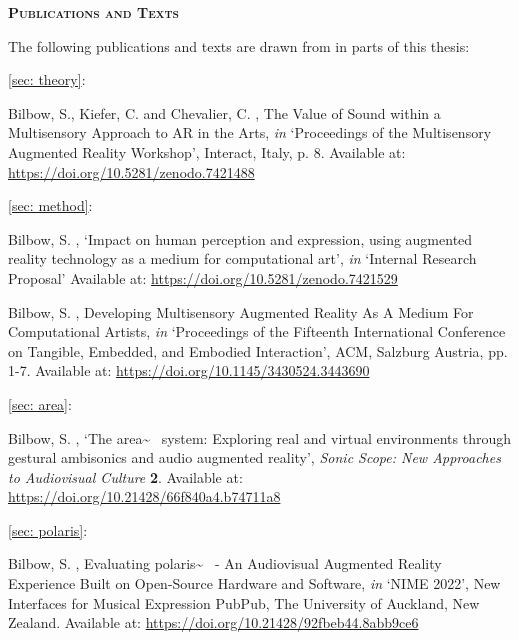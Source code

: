 \newpage
{}
{}
\begin{flushleft}
	\Huge \textsc{\textbf{Publications and Texts}}

\end{flushleft}
\noindent The following publications and texts are drawn from in parts of this thesis:

\noindent\autoref{sec: theory}: 

\begin{hangparas}{.25in}{1}
	Bilbow, S., Kiefer, C. and Chevalier, C. \citeyearpar{bilbow2021}, The Value of Sound within a Multisensory Approach to AR in the Arts, \textit{in} `Proceedings of the Multisensory Augmented Reality Workshop', Interact, Italy, p. 8. Available at: \url{https://doi.org/10.5281/zenodo.7421488}
\end{hangparas}

\vspace*{0.75cm}
\noindent\autoref{sec: method}: 

\begin{hangparas}{.25in}{1}
	Bilbow, S. \citeyearpar{bilbow2020}, `Impact on human perception and expression, using augmented reality technology as a medium for computational art', \textit{in} `Internal Research Proposal' Available at: \url{https://doi.org/10.5281/zenodo.7421529}
\end{hangparas}

\begin{hangparas}{.25in}{1}
	Bilbow, S. \citeyearpar{bilbow2021b}, Developing Multisensory Augmented Reality As A Medium For Computational Artists, \textit{in} `Proceedings of the Fifteenth International Conference on Tangible, Embedded, and Embodied Interaction', ACM, Salzburg Austria, pp. 1-7. Available at: \url{https://doi.org/10.1145/3430524.3443690}
\end{hangparas}

\vspace*{0.75cm}
\noindent\autoref{sec: area}: 

\begin{hangparas}{.25in}{1}
	Bilbow, S. \citeyearpar{bilbow2021a}, `The area\textasciitilde{}~ system: Exploring real and virtual environments through gestural ambisonics and audio augmented reality', \textit{Sonic Scope: New Approaches to Audiovisual Culture} \textbf{2}. Available at: \url{https://doi.org/10.21428/66f840a4.b74711a8}
\end{hangparas}

\vspace*{0.75cm}
\noindent\autoref{sec: polaris}: 

\begin{hangparas}{.25in}{1}
	Bilbow, S. \citeyearpar{bilbow2022}, Evaluating polaris\textasciitilde{}~ - An Audiovisual Augmented Reality Experience Built on Open-Source Hardware and Software, \textit{in} `NIME 2022', New Interfaces for Musical Expression PubPub, The University of Auckland, New Zealand. Available at: \url{https://doi.org/10.21428/92fbeb44.8abb9ce6}
\end{hangparas}